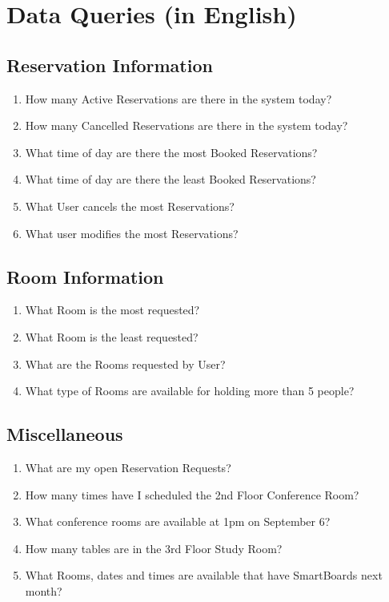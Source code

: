 \documentclass[11pt]{report}
\begin{document}
\section*{Data Queries (in English)}
\subsection*{Reservation Information}
\begin{enumerate}
\item How many Active Reservations are there in the system today?
\item How many Cancelled Reservations are there in the system today?
\item What time of day are there the most Booked Reservations?
\item What time of day are there the least Booked Reservations?
\item What User cancels the most Reservations?
\item What user modifies the most Reservations?
\end{enumerate}

\subsection*{Room Information}
\begin{enumerate}
\item What Room is the most requested?
\item What Room is the least requested?
\item What are the Rooms requested by User?
\item What type of Rooms are available for holding more than 5 people?
\end{enumerate}

\subsection*{Miscellaneous}
\begin{enumerate}
\item What are my open Reservation Requests?
\item How many times have I scheduled the 2nd Floor Conference Room?
\item What conference rooms are available at 1pm on September 6?
\item How many tables are in the 3rd Floor Study Room?
\item What Rooms, dates and times are available that have SmartBoards next month?
\end{enumerate}
\end{document}
